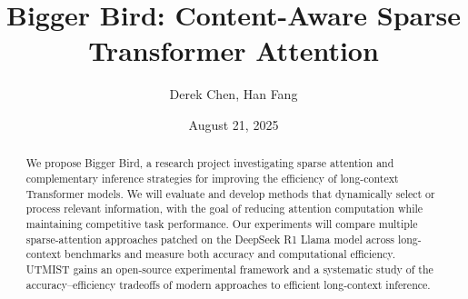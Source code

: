 \documentclass{article}
\title{\textbf{Bigger Bird: Content-Aware Sparse Transformer Attention}} %
\author{Derek Chen, Han Fang} %
\date{August 21, 2025} %
\begin{document}
\maketitle

\begin{abstract} %
    We propose Bigger Bird, a research project investigating sparse attention and complementary inference strategies for improving the efficiency of long-context Transformer models. We will evaluate and develop methods that dynamically select or process relevant information, with the goal of reducing attention computation while maintaining competitive task performance. Our experiments will compare multiple sparse-attention approaches patched on the DeepSeek R1 Llama model across long-context benchmarks and measure both accuracy and computational efficiency. UTMIST gains an open-source experimental framework and a systematic study of the accuracy–efficiency tradeoffs of modern approaches to efficient long-context inference.
\end{abstract}
\end{document}
